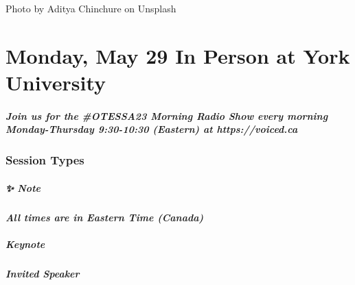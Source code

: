 \documentclass[
]{book}
\begin{document}
Photo by Aditya Chinchure on Unsplash

\hypertarget{monday-may-29-in-person-at-york-university}{%
\chapter{Monday, May 29 \textbar{} In Person at York University}\label{monday-may-29-in-person-at-york-university}}

\begin{protip}
\hypertarget{join-us-for-the-otessa23-morning-radio-show-every-morning-monday-thursday-930-1030-eastern-at-httpsvoiced.ca}{%
\paragraph{Join us for the \#OTESSA23 Morning Radio Show every morning
Monday-Thursday 9:30-10:30 (Eastern) at
https://voiced.ca}\label{join-us-for-the-otessa23-morning-radio-show-every-morning-monday-thursday-930-1030-eastern-at-httpsvoiced.ca}}
\end{protip}

\hypertarget{session-types-1}{%
\subsection*{Session Types}\label{session-types-1}}

\begin{protip}
\hypertarget{note}{%
\paragraph*{✨ Note}\label{note}}

\textbf{\emph{All times are in Eastern Time (Canada)}}
\end{protip}

\begin{keynote}
\hypertarget{keynote}{%
\paragraph{Keynote}\label{keynote}}
\end{keynote}

\begin{speaker}
\hypertarget{invited-speaker}{%
\paragraph{Invited Speaker}\label{invited-speaker}}
\end{speaker}
\end{document}
